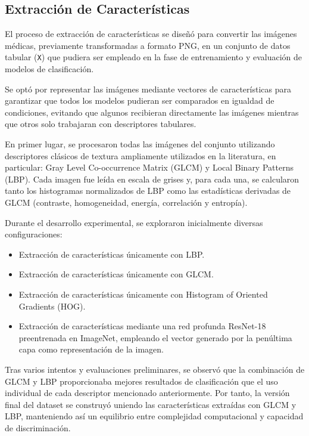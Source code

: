 \documentclass[conference]{IEEEtran}
\begin{document}
\subsection{Extracción de Características}

El proceso de extracción de características se diseñó para convertir las imágenes médicas, previamente transformadas a formato PNG, en un conjunto de datos tabular (\texttt{X}) que pudiera ser empleado en la fase de entrenamiento y evaluación de modelos de clasificación. 

Se optó por representar las imágenes mediante vectores de características para garantizar que todos los modelos pudieran ser comparados en igualdad de condiciones, evitando que algunos recibieran directamente las imágenes mientras que otros solo trabajaran con descriptores tabulares.

En primer lugar, se procesaron todas las imágenes del conjunto utilizando descriptores clásicos de textura ampliamente utilizados en la literatura, en particular: Gray Level Co-occurrence Matrix (GLCM) y Local Binary Patterns (LBP). Cada imagen fue leída en escala de grises y, para cada una, se calcularon tanto los histogramas normalizados de LBP como las estadísticas derivadas de GLCM (contraste, homogeneidad, energía, correlación y entropía).

Durante el desarrollo experimental, se exploraron inicialmente diversas configuraciones:
\begin{itemize}
    \item Extracción de características únicamente con LBP.
    \item Extracción de características únicamente con GLCM.
    \item Extracción de características únicamente con Histogram of Oriented Gradients (HOG).
    \item Extracción de características mediante una red profunda ResNet-18 preentrenada en ImageNet, empleando el vector generado por la penúltima capa como representación de la imagen.
\end{itemize}

Tras varios intentos y evaluaciones preliminares, se observó que la combinación de GLCM y LBP proporcionaba mejores resultados de clasificación que el uso individual de cada descriptor mencionado anteriormente. Por tanto, la versión final del dataset se construyó uniendo las características extraídas con GLCM y LBP, manteniendo así un equilibrio entre complejidad computacional y capacidad de discriminación.
\end{document}
